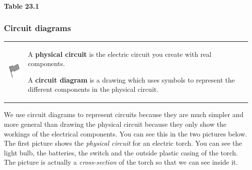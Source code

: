     \begin{center}{\small\bfseries Table 23.1}\end{center}

    
    \addtocounter{footnote}{-0}
    
    \par
  
        
        \label{m38771*uid13}
            \subsubsection{ Circuit diagrams}
            \nopagebreak
            
          
\par
            \label{m38771*fhsst!!!underscore!!!id258}\begin{definition}
	  \begin{tabular*}{15 cm}{m{15 mm}m{}}
	\hspace*{-50pt}  \includegraphics[width=0.5in]{col11305.imgs/psflag2.png}   & \Definition{   \label{id2478537}\textbf{ Representing circuits }} { \label{m38771*meaningfhsst!!!underscore!!!id258}
          \label{m38771*id63196}A \textbf{physical circuit} is the electric circuit you create with real components.\par 
          \label{m38771*id63206}A \textbf{circuit diagram} is a drawing which uses symbols to represent the different components in the physical circuit.
 \par 
           } 
      \end{tabular*}
      \end{definition}

          \label{m38771*id63223}We use circuit diagrams to represent circuits because they are much simpler and more general than drawing the physical circuit because they only show the workings of the electrical components. You can see this in the two pictures below. The first picture shows the \textsl{physical circuit} for an electric torch. You can see the light bulb, the batteries, the switch and the outside plastic casing of the torch. The picture is actually a \textsl{cross-section} of the torch so that we can see inside it.\par 
          
    \setcounter{subfigure}{0}


